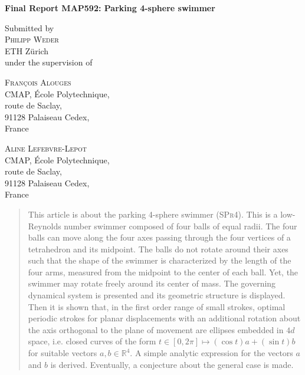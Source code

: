 \documentclass[10pt,a4paper]{article}
\author{Philipp Weder}
\date{}
\numberwithin{equation}{section}
\theoremstyle{plain}
\theoremstyle{plain}
\theoremstyle{plain}
\theoremstyle{remark}
\theoremstyle{definition}
\theoremstyle{definition}
\theoremstyle{plain}
\theoremstyle{plain}
\newcommand{\R}{\mathbb{R}}
\newcommand{\spr}{\textsc{SPr4}}
\begin{document}
\thispagestyle{plain}
\begin{center}
\begin{Large}
\textbf{Final Report MAP592: Parking 4-sphere swimmer}\\
\end{Large}
\vspace{1em}
Submitted by\\
\textsc{Philipp Weder}\\
ETH Zürich\\
under the supervision of\\
\end{center}
\vspace{1em}
\begin{minipage}[t]{0.5\textwidth}
\begin{center}
\textsc{François Alouges}\\
CMAP, École Polytechnique,\\
route de Saclay,\\
91128 Palaiseau Cedex,\\
France
\end{center}
\end{minipage}
\begin{minipage}[t]{0.5\textwidth}
\begin{center}
\textsc{Aline Lefebvre-Lepot}\\
CMAP, École Polytechnique,\\
route de Saclay,\\
91128 Palaiseau Cedex,\\
France
\end{center}
\end{minipage}


\begin{abstract}
This article is about the parking 4-sphere swimmer (\spr). This is a low-Reynolds number swimmer composed of four balls of equal radii. The four balls can move along the four axes passing through the four vertices of a tetrahedron and its midpoint. The balls do not rotate around their axes such that the shape of the swimmer is characterized by the length of the four arms, measured from the midpoint to the center of each ball. Yet, the swimmer may rotate freely around its center of mass. The governing dynamical system is presented and its geometric structure is displayed. Then it is shown that, in the first order range of small strokes, optimal periodic strokes for planar displacements with an additional rotation about the axis orthogonal to the plane of movement are ellipses embedded in $4d$ space, i.e. closed curves of the form $t \in [0, 2 \pi] \mapsto (\cos t) a + (\sin t) b$ for suitable vectors $a, b \in \R^4$. A simple analytic expression for the vectors $a$ and $b$ is derived. Eventually, a conjecture about the general case is made.
\end{abstract}
\end{document}
